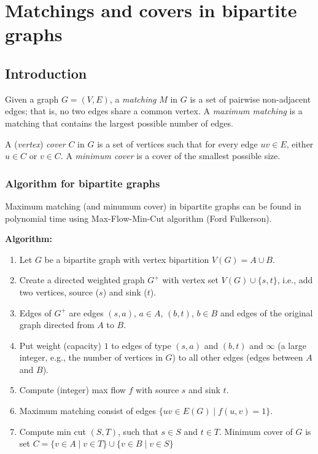 \chapter{Matchings and covers in bipartite graphs}

\section{Introduction}

Given a graph $G = (V,E)$, a \emph{matching} $M$ in $G$ is a set of pairwise non-adjacent edges; that is, no two edges share a common vertex. A \emph{maximum matching} is a matching that contains the largest possible number of edges.

A (\emph{vertex}) \emph{cover} $C$ in $G$ is a set of vertices such that for every edge $uv \in E$, either $u \in C$ or $v \in C$. A \emph{minimum cover} is a cover of the smallest possible size.

\subsection{Algorithm for bipartite graphs}

Maximum matching (and minumum cover) in bipartite graphs can be found in polynomial time using Max-Flow-Min-Cut algorithm (Ford Fulkerson).

\medskip
\noindent \textbf{Algorithm:}
\begin{enumerate}
\item Let $G$ be a bipartite graph with vertex bipartition $V(G) = A \cup B$.
\item Create a directed weighted graph $G^+$ with vertex set $V(G) \cup \{s, t\}$, i.e., add two vertices, source ($s$) and sink ($t$).
\item Edges of $G^+$ are edges $(s, a)$, $a \in A$, $(b, t)$, $b \in B$ and edges of the original graph directed from $A$ to $B$.
\item Put weight (capacity) $1$ to edges of type $(s, a)$ and $(b, t)$ and $\infty$ (a large integer, e.g., the number of vertices in $G$) to all other edges (edges between $A$ and $B$).
\item Compute (integer) max flow $f$ with source $s$ and sink $t$.
\item Maximum matching consist of edges $\{uv \in E(G) \mid f(u, v) = 1\}$.
\item Compute min cut $(S, T)$, such that $s \in S$ and $t \in T$.  Minimum cover of $G$ is set $C = \{v \in A \mid v \in T\} \cup \{v \in B \mid v \in S\}$
\end{enumerate}

